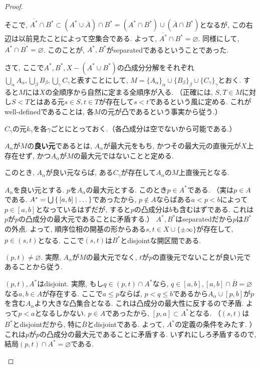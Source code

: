 \documentclass[a4paper, twoside]{bxjsarticle}
\theoremstyle{definition}
\begin{document}
\begin{proof}
\begin{framed}
            そこで, $\overline{A^*}\cap B^*\subset (A^*\cup \overline{A})\cap B^*=(A^*\cap B^*)\cup (\overline{A}\cap B^*)$となるが, この右辺は以前見たことによって空集合である. よって, $\overline{A^*}\cap B^*=\varnothing$. 同様にして, $A^*\cap \overline{B^*}=\varnothing$. このことが, $A^*, B^*$がseparatedであるということであった.
            \end{framed}
            
            さて, ここで$A^*, B^*, X-(A^*\cup B^*)$の凸成分分解をそれぞれ$\bigcup_\alpha A_\alpha, \bigcup_\beta B_\beta, \bigcup_\gamma C_\gamma$と表すことにして, $M=\{A_\alpha\}_\alpha\cup\{B_\beta\}_\beta\cup\{C_\gamma\}_\gamma$とおく. すると$M$には$X$の全順序から自然に定まる全順序が入る. （正確には, $S, T\in M$に対し$S<T$とはある元$s\in S, t\in T$が存在して$s<t$であるという風に定める. これがwell-definedであることは, 各$M$の元が凸であるという事実から従う.） 
            
            $C_\gamma$の元$k_\gamma$を各$\gamma$ごとにとっておく.（各凸成分は空でないから可能である.） 

            $A_\alpha$が$M$の\textbf{良い元}であるとは, $A_\alpha$が最大元をもち, かつその最大元の直後元が$X$上存在せず, かつ$A_\alpha$が$M$の最大元ではないことと定める. 
            
            このとき, $A_\alpha$が良い元ならば, ある$C_\gamma$が存在して$A_\alpha$の$M$上直後元となる.
            \begin{framed}
                $A_\alpha$を良い元とする. $p$を$A_\alpha$の最大元とする. このとき$p\in A^*$である. （実は$p\in A$である. $A^*=\bigcup\set{[a, b]|\dots}$であったから, $p\not\in A$ならばある$a<p<b$によって$p\in[a, b]$となっているはずだが, すると$p$の凸成分は$b$も含むはずである. これは$p$が$p$の凸成分の最大元であることに矛盾する.） $A^*, B^*$はseparatedだから$p$は$B^*$の外点. よって, 順序位相の開基の形からある$s, t\in X\cup\{\pm\infty\}$が存在して, $p\in (s, t)$となる. ここで$(s, t)$は$\overline{B^*}$とdisjointな開区間である.
                
                $(p, t)\neq \varnothing$. 実際, $A_\alpha$が$M$の最大元でなく, $t$が$p$の直後元でないことが良い元であることから従う.
                
                $(p, t), A^*$はdisjoint. 実際, もし$q\in (p, t)\cap A^*$なら, $q\in [a, b], [a, b]\cap\overline{B}=\varnothing$なる$a, b\in A$が存在する. ここで$a\leq p$ならば, $p<q\leq b$であるから$A_\alpha\cup [p, b]$が$p$を含む$A_\alpha$より大きな凸集合となる. これは凸成分の最大性に反するので矛盾. よって$p<a$となるしかない. $p\in A$であったから, $[p, a]\subset A^*$となる. （$(s, t)$は$\overline{B^*}$とdisjointだから, 特に$\overline{B}$とdisjointである. よって, $A^*$の定義の条件をみたす. ）これは$p$が$p$の凸成分の最大元であることに矛盾する. いずれにしろ矛盾するので, 結局$(p, t)\cap A^* = \varnothing$である.
                

\end{framed}
\end{proof}
\end{document}
